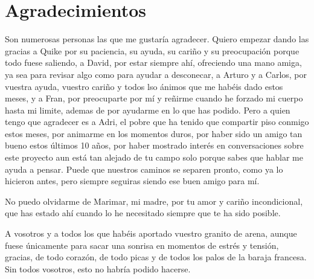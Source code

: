 \chapter{Agradecimientos}

Son numerosas personas las que me gustaría agradecer. Quiero empezar dando las gracias a Quike por su paciencia, su ayuda, su cariño y su preocupación porque todo fuese saliendo, a David, por estar siempre ahí, ofreciendo una mano amiga, ya sea para revisar algo como para ayudar a desconecar, a Arturo y a Carlos, por vuestra ayuda, vuestro cariño y todos lso ánimos que me habéis dado estos meses, y  a Fran, por preocuparte por mí y reñirme cuando he forzado mi cuerpo hasta mi limite, ademas de por ayudarme en lo que has podido. Pero a quien tengo que agradecer es a Adri, el pobre que ha tenido que compartir piso conmigo estos meses,  por animarme en los momentos duros,  por haber sido un amigo tan bueno estos últimos 10 años, por haber mostrado interés en conversaciones sobre este proyecto aun está tan alejado de tu campo solo porque sabes que hablar me ayuda a pensar. Puede que nuestros caminos se separen pronto, como ya lo hicieron antes, pero siempre seguiras siendo ese buen amigo para mí.

No puedo olvidarme de Marimar, mi madre, por tu amor y cariño incondicional, que has estado ahí cuando lo he necesitado siempre que te ha sido posible.

A vosotros y a todos los que habéis aportado vuestro granito de arena, aunque fuese únicamente para sacar una sonrisa en momentos de estrés y tensión, gracias, de todo corazón, de todo picas y de todos los palos de la baraja francesa. Sin todos vosotros, esto no habría podido hacerse.